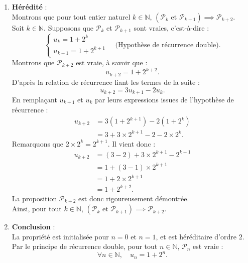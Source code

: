 \documentclass[11pt,a4paper]{article}
\newcommand{\N}{\mathbb{N}}
\begin{document}
\begin{correctionbox}
\begin{enumerate}[label=\textbf{\arabic*.}]
    \item \textbf{Hérédité} :\\
    Montrons que pour tout entier naturel $k \in \N$, $(\mathcal{P}_k \text{ et } \mathcal{P}_{k+1}) \implies \mathcal{P}_{k+2}$.\\
    Soit $k \in \N$. Supposons que $\mathcal{P}_k$ et $\mathcal{P}_{k+1}$ sont vraies, c'est-à-dire :
    \[
    \begin{cases}
    u_k = 1 + 2^k \\
    u_{k+1} = 1 + 2^{k+1}
    \end{cases}
    \quad \text{(Hypothèse de récurrence double)}.
    \]
    Montrons que $\mathcal{P}_{k+2}$ est vraie, à savoir que :
    \[
    u_{k+2} = 1 + 2^{k+2}.
    \]
    D'après la relation de récurrence liant les termes de la suite :
    \[
    u_{k+2} = 3u_{k+1} - 2u_k.
    \]
    En remplaçant $u_{k+1}$ et $u_k$ par leurs expressions issues de l'hypothèse de récurrence :
    \begin{align*}
    u_{k+2} &= 3(1 + 2^{k+1}) - 2(1 + 2^k) \\
            &= 3 + 3 \times 2^{k+1} - 2 - 2 \times 2^k.
    \end{align*}
    Remarquons que $2 \times 2^k = 2^{k+1}$. Il vient donc :
    \begin{align*}
    u_{k+2} &= (3 - 2) + 3 \times 2^{k+1} - 2^{k+1} \\
            &= 1 + (3 - 1) \times 2^{k+1} \\
            &= 1 + 2 \times 2^{k+1} \\
            &= 1 + 2^{k+2}.
    \end{align*}
    La proposition $\mathcal{P}_{k+2}$ est donc rigoureusement démontrée.\\
    Ainsi, pour tout $k \in \N$, $(\mathcal{P}_k \text{ et } \mathcal{P}_{k+1}) \implies \mathcal{P}_{k+2}$.

    \item \textbf{Conclusion} :\\
    La propriété est initialisée pour $n=0$ et $n=1$, et est héréditaire d'ordre $2$. Par le principe de récurrence double, pour tout $n \in \N$, $\mathcal{P}_n$ est vraie :
    \[
    \forall n \in \N, \quad u_n = 1 + 2^n.
    \]
\end{enumerate}
\end{correctionbox}
\end{document}
